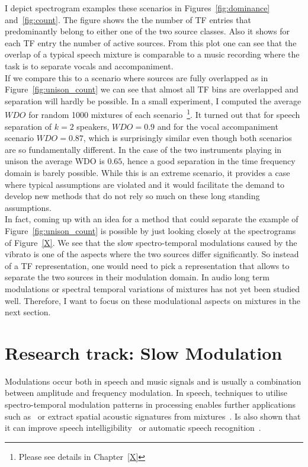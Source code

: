 I depict spectrogram examples these scenarios in Figures~\ref{fig:dominance} and~\ref{fig:count}.
The figure shows the the number of TF entries that predominantly belong to either one of the two source classes.
Also it shows for each TF entry the number of active sources.
From this plot one can see that the overlap of a typical speech mixture is comparable to a music recording where the task is to separate vocals and accompaniment.\\

If we compare this to a scenario where sources are fully overlapped as in Figure~\ref{fig:unison_count} we can see that almost all TF bins are overlapped and separation will hardly be possible.
In a small experiment, I computed the average \(WDO\) for random 1000 mixtures of each scenario~\footnote{Please see details in Chapter~\ref{X}}.
It turned out that for speech separation of \(k=2\) speakers, \(WDO=0.9\) and for the vocal accompaniment scenario \(WDO=0.87\), which is surprisingly similar even though both scenarios are so fundamentally different.
In the case of the two instruments playing in unison the average WDO is \(0.65\), hence a good separation in the time frequency domain is barely possible.
While this is an extreme scenario, it provides a case where typical assumptions are violated and it would facilitate the demand to develop new methods that do not rely so much on these long standing assumptions.
\\
In fact, coming up with an idea for a method that could separate the example of Figure~\ref{fig:unison_count} is possible by just looking closely at the spectrograms of Figure~\ref{X}.
We see that the slow spectro-temporal modulations caused by the vibrato is one of the aspects where the two sources differ significantly.
So instead of a TF representation, one would need to pick a representation that allows to separate the two sources in their modulation domain.
In audio long term modulations or spectral temporal variations of mixtures has not yet been studied well.
Therefore, I want to focus on these modulational aspects on mixtures in the next section.

\hypertarget{research-track-modulations}{%
\section{Research track: Slow Modulation}\label{research-track-modulations}}

Modulations occur both in speech and music signals and is usually a combination between amplitude and frequency modulation.
In speech, techniques to utilise spectro-temporal modulation patterns in processing enables further applications such as~\cite{mesgarani04} or extract spatial acoustic signatures from mixtures~\cite{sukittanon06}.
Is also shown that it can improve speech intelligibility~\cite{elhilali03} or automatic speech recognition~\cite{kingsbury98}.

